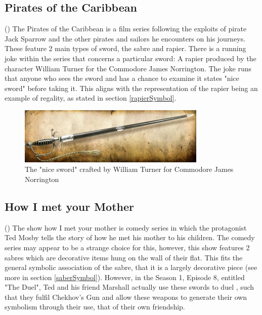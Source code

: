 \documentclass{article}
\begin{document}
\subsection{Pirates of the Caribbean}

()
The Pirates of the Caribbean is a film series following the exploits of pirate Jack Sparrow and the other pirates and sailors he encounters on his journeys. These feature 2 main types of sword, the sabre and rapier. There is a running joke within the series that concerns a particular sword: A rapier produced by the character William Turner for the Commodore James Norrington. The joke runs that anyone who sees the sword and has a chance to examine it states "nice sword" before taking it. This aligns with the representation of the rapier being an example of regality, as stated in section \ref{rapierSymbol}.

\begin{figure}[h]
    \centering
    \includegraphics[width=0.8\textwidth]{Norringtonssword.png}
    \caption{\parencite{potcsword}The "nice sword" crafted by William Turner for Commodore James Norrington}
    \label{fig:potcSword}
\end{figure}

\subsection{How I met your Mother}

()
The show how I met your mother is comedy series in which the protagonist Ted Mosby tells the story of how he met his mother to his children. The comedy series may appear to be a strange choice for this, however, this show features 2 sabres which are decorative items hung on the wall of their flat. This fits the general symbolic association of the sabre, that it is a largely decorative piece (see more in section \ref{saberSymbol}). However, in the Season 1, Episode 8, entitled "The Duel", Ted and his friend Marshall actually use these swords to duel \parencite{theduel}, such that they fulfil Chekhov's Gun \parencite{delaney1990chekhov} and allow these weapons to generate their own symbolism through their use, that of their own friendship.
\end{document}
